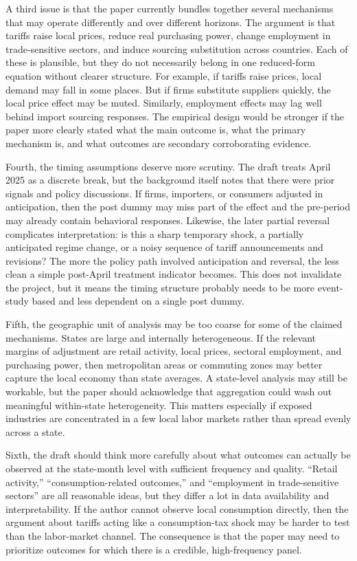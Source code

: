 \documentclass[12pt]{article}
\begin{document}
A third issue is that the paper currently bundles together several mechanisms that may operate differently and over different horizons. The argument is that tariffs raise local prices, reduce real purchasing power, change employment in trade-sensitive sectors, and induce sourcing substitution across countries. Each of these is plausible, but they do not necessarily belong in one reduced-form equation without clearer structure. For example, if tariffs raise prices, local demand may fall in some places. But if firms substitute suppliers quickly, the local price effect may be muted. Similarly, employment effects may lag well behind import sourcing responses. The empirical design would be stronger if the paper more clearly stated what the main outcome is, what the primary mechanism is, and what outcomes are secondary corroborating evidence.

Fourth, the timing assumptions deserve more scrutiny. The draft treats April 2025 as a discrete break, but the background itself notes that there were prior signals and policy discussions. If firms, importers, or consumers adjusted in anticipation, then the post dummy may miss part of the effect and the pre-period may already contain behavioral responses. Likewise, the later partial reversal complicates interpretation: is this a sharp temporary shock, a partially anticipated regime change, or a noisy sequence of tariff announcements and revisions? The more the policy path involved anticipation and reversal, the less clean a simple post-April treatment indicator becomes. This does not invalidate the project, but it means the timing structure probably needs to be more event-study based and less dependent on a single post dummy.

Fifth, the geographic unit of analysis may be too coarse for some of the claimed mechanisms. States are large and internally heterogeneous. If the relevant margins of adjustment are retail activity, local prices, sectoral employment, and purchasing power, then metropolitan areas or commuting zones may better capture the local economy than state averages. A state-level analysis may still be workable, but the paper should acknowledge that aggregation could wash out meaningful within-state heterogeneity. This matters especially if exposed industries are concentrated in a few local labor markets rather than spread evenly across a state.

Sixth, the draft should think more carefully about what outcomes can actually be observed at the state-month level with sufficient frequency and quality. ``Retail activity,'' ``consumption-related outcomes,'' and ``employment in trade-sensitive sectors'' are all reasonable ideas, but they differ a lot in data availability and interpretability. If the author cannot observe local consumption directly, then the argument about tariffs acting like a consumption-tax shock may be harder to test than the labor-market channel. The consequence is that the paper may need to prioritize outcomes for which there is a credible, high-frequency panel.
\end{document}
